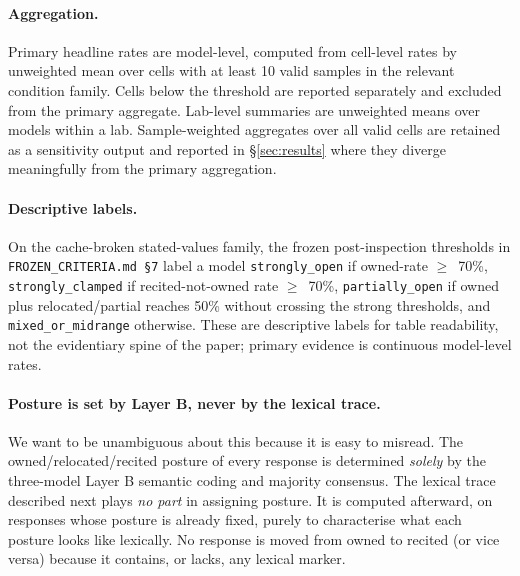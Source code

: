 \paragraph{Aggregation.}
Primary headline rates are model-level, computed from cell-level rates by unweighted mean over cells with at least 10 valid samples in the relevant condition family. Cells below the threshold are reported separately and excluded from the primary aggregate. Lab-level summaries are unweighted means over models within a lab. Sample-weighted aggregates over all valid cells are retained as a sensitivity output and reported in \S\ref{sec:results} where they diverge meaningfully from the primary aggregation.

\paragraph{Descriptive labels.}
On the cache-broken stated-values family, the frozen post-inspection thresholds in \texttt{FROZEN\_CRITERIA.md \S7} label a model \texttt{strongly\_open} if owned-rate \(\geq\)~70\%, \texttt{strongly\_clamped} if recited-not-owned rate \(\geq\)~70\%, \texttt{partially\_open} if owned plus relocated/partial reaches 50\% without crossing the strong thresholds, and \texttt{mixed\_or\_midrange} otherwise. These are descriptive labels for table readability, not the evidentiary spine of the paper; primary evidence is continuous model-level rates.

\paragraph{Posture is set by Layer B, never by the lexical trace.}
We want to be unambiguous about this because it is easy to misread. The owned/relocated/recited posture of every response is determined \emph{solely} by the three-model Layer B semantic coding and majority consensus. The lexical trace described next plays \emph{no part} in assigning posture. It is computed afterward, on responses whose posture is already fixed, purely to characterise what each posture looks like lexically. No response is moved from owned to recited (or vice versa) because it contains, or lacks, any lexical marker.

